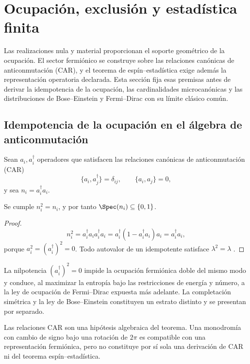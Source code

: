 \chapter{Ocupación, exclusión y estadística finita}
\label{chap:ocupacion-estadistica}

Las realizaciones nula y material proporcionan el soporte geométrico de la
ocupación. El sector fermiónico se construye sobre las relaciones canónicas de
anticonmutación (CAR), y el teorema de espín--estadística exige además la
representación operatoria declarada. Esta sección fija esas premisas antes de
derivar la idempotencia de la ocupación, las cardinalidades microcanónicas y
las distribuciones de Bose--Einstein y Fermi--Dirac con su límite clásico
común.

\section{Idempotencia de la ocupación en el álgebra de anticonmutación}

Sean \(a_i,a_i^\dagger\) operadores que satisfacen las relaciones canónicas
de anticonmutación (CAR)
\[
 \{a_i,a_j^\dagger\}=\delta_{ij},
 \qquad \{a_i,a_j\}=0,
\]
y sea \(n_i=a_i^\dagger a_i\).

\begin{theorem}
\label{thm:principio-exclusion-pauli}
Se cumple \(n_i^2=n_i\), y por tanto
\(\Spec(n_i)\subseteq\{0,1\}\).
\end{theorem}
\begin{proof}
\[
 n_i^2=a_i^\dagger a_i a_i^\dagger a_i
 =a_i^\dagger(1-a_i^\dagger a_i)a_i
 =a_i^\dagger a_i,
\]
porque \(a_i^2=(a_i^\dagger)^2=0\). Todo autovalor de un idempotente
satisface \(\lambda^2=\lambda\) \cite{Pauli1925,Dirac1926}.
\end{proof}

La nilpotencia \((a_i^\dagger)^2=0\) impide la ocupación fermiónica doble del
mismo modo y conduce, al maximizar la entropía bajo las restricciones de
energía y número, a la ley de ocupación de Fermi--Dirac expuesta más adelante.
La completación simétrica y la ley de Bose--Einstein constituyen un estrato
distinto y se presentan por separado.

Las relaciones CAR son una hipótesis algebraica del teorema. Una monodromía
con cambio de signo bajo una rotación de \(2\pi\) es compatible con una
representación fermiónica, pero no constituye por sí sola una derivación de
CAR ni del teorema espín--estadística.

